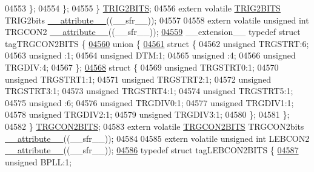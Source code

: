\begin{DoxyCode}
04553     \};
04554   \};
04555 \} \hyperlink{a00008_d7/d60/a00816}{TRIG2BITS};
04556 \textcolor{keyword}{extern} \textcolor{keyword}{volatile} \hyperlink{a00008_d7/d60/a00816}{TRIG2BITS} TRIG2bits \hyperlink{a00009_a493c46f03454991ccc5aa7a6e1dfb2a7}{\_\_attribute\_\_}((\_\_sfr\_\_));
04557 
04558 \textcolor{keyword}{extern} \textcolor{keyword}{volatile} \textcolor{keywordtype}{unsigned} \textcolor{keywordtype}{int}  TRGCON2 \hyperlink{a00009_a493c46f03454991ccc5aa7a6e1dfb2a7}{\_\_attribute\_\_}((\_\_sfr\_\_));
\hypertarget{a00009_source_l04559}{}\hyperlink{a00008}{04559} \_\_extension\_\_ \textcolor{keyword}{typedef} \textcolor{keyword}{struct }tagTRGCON2BITS \{
\hypertarget{a00009_source_l04560}{}\hyperlink{a00009}{04560}   \textcolor{keyword}{union }\{
\hypertarget{a00009_source_l04561}{}\hyperlink{a00009}{04561}     \textcolor{keyword}{struct }\{
04562       \textcolor{keywordtype}{unsigned} TRGSTRT:6;
04563       \textcolor{keywordtype}{unsigned} :1;
04564       \textcolor{keywordtype}{unsigned} DTM:1;
04565       \textcolor{keywordtype}{unsigned} :4;
04566       \textcolor{keywordtype}{unsigned} TRGDIV:4;
04567     \};
\hypertarget{a00009_source_l04568}{}\hyperlink{a00009}{04568}     \textcolor{keyword}{struct }\{
04569       \textcolor{keywordtype}{unsigned} TRGSTRT0:1;
04570       \textcolor{keywordtype}{unsigned} TRGSTRT1:1;
04571       \textcolor{keywordtype}{unsigned} TRGSTRT2:1;
04572       \textcolor{keywordtype}{unsigned} TRGSTRT3:1;
04573       \textcolor{keywordtype}{unsigned} TRGSTRT4:1;
04574       \textcolor{keywordtype}{unsigned} TRGSTRT5:1;
04575       \textcolor{keywordtype}{unsigned} :6;
04576       \textcolor{keywordtype}{unsigned} TRGDIV0:1;
04577       \textcolor{keywordtype}{unsigned} TRGDIV1:1;
04578       \textcolor{keywordtype}{unsigned} TRGDIV2:1;
04579       \textcolor{keywordtype}{unsigned} TRGDIV3:1;
04580     \};
04581   \};
04582 \} \hyperlink{a00008_df/dc7/a00807}{TRGCON2BITS};
04583 \textcolor{keyword}{extern} \textcolor{keyword}{volatile} \hyperlink{a00008_df/dc7/a00807}{TRGCON2BITS} TRGCON2bits \hyperlink{a00009_a493c46f03454991ccc5aa7a6e1dfb2a7}{\_\_attribute\_\_}((\_\_sfr\_\_));
04584 
04585 \textcolor{keyword}{extern} \textcolor{keyword}{volatile} \textcolor{keywordtype}{unsigned} \textcolor{keywordtype}{int}  LEBCON2 \hyperlink{a00009_a493c46f03454991ccc5aa7a6e1dfb2a7}{\_\_attribute\_\_}((\_\_sfr\_\_));
\hypertarget{a00009_source_l04586}{}\hyperlink{a00008}{04586} \textcolor{keyword}{typedef} \textcolor{keyword}{struct }tagLEBCON2BITS \{
\hypertarget{a00009_source_l04587}{}\hyperlink{a00008_a734b807d032fa494468c04783b84279d}{04587}   \textcolor{keywordtype}{unsigned} BPLL:1;

\end{DoxyCode}
